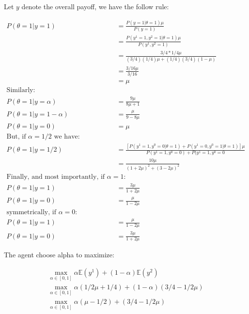 \documentclass{article}
\begin{document}
Let $y$ denote the overall payoff, we have the follow rule:

\begin{equation}
\begin{split}
P(\theta = 1 | y = 1) & = \frac{P(y = 1| \theta = 1) \mu}{P(y = 1)} \\
                      & = \frac{P(y^1 = 1, y^2 = 1 | \theta = 1)\mu}{P(y^1, y^2=1)} \\
                      & = \frac{3/4*1/4\mu}{(3/4)(1/4)\mu + (1/4)(3/4)(1 - \mu)} \\
                      & = \frac{3/16\mu}{3/16} \\
                      & = \mu \\
\text{Similarly:}     & \\
P(\theta = 1|y=\alpha)& = \frac{9\mu}{8\mu + 1} \\
P(\theta=1|y=1-\alpha)& = \frac{\mu}{9 - 8\mu} \\
P(\theta = 1| y = 0)  & = \mu \\
\text{But, if $\alpha = 1/2$ we have:} \\
P(\theta = 1|y = 1/2) & = \frac{[P(y^1 = 1, y^0 = 0 | \theta = 1) +
                                P(y^1 = 0, y^0 = 1 | \theta = 1)]\mu}
                               {P(y^1 = 1, y^0 = 0) + P(y^1 = 1, y^0 = 0} \\
                      & = \frac{10\mu}{(1 + 2\mu)^2 + (3 - 2\mu)^2} \\
\text{Finally, and most importantly, if $\alpha = 1$: } & \\
P(\theta = 1|y = 1)   & = \frac{3\mu}{1 + 2\mu} \\
P(\theta = 1|y = 0)   & = \frac{\mu}{1 - 2\mu} \\
\text{symmetrically, if $\alpha = 0$: } & \\
P(\theta = 1|y = 1)   & = \frac{\mu}{1 - 2\mu} \\
P(\theta = 1|y = 0)   & = \frac{3\mu}{1 + 2\mu}
\end{split}
\end{equation}

The agent choose alpha to maximize:

\begin{equation}
\begin{split}
  \max_{\alpha \in [0,1]} \alpha\mathbb{E}(y^1) + (1 - \alpha)\mathbb{E}(y^2) \\
  \max_{\alpha \in [0,1]} \alpha(1/2\mu + 1/4) + (1 - \alpha)(3/4 - 1/2\mu) \\
  \max_{\alpha \in [0,1]} \alpha(\mu - 1/2) + (3/4 - 1/2\mu)
\end{split}
\end{equation}
\end{document}

